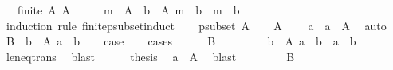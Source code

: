 \begin{isabellebody}
\ \ {\isachardoublequoteopen}{\isasymlbrakk}\ finite\ A{\isacharsemicolon}{\kern0pt}\ A\ {\isasymnoteq}\ {\isacharbraceleft}{\kern0pt}{\isacharbraceright}{\kern0pt}\ {\isasymrbrakk}\ {\isasymLongrightarrow}\ {\isasymexists}\ m\ {\isasymin}\ A{\isachardot}{\kern0pt}\ {\isasymforall}\ b\ {\isasymin}\ A{\isachardot}{\kern0pt}\ m\ {\isasymle}\ b\ {\isasymlongrightarrow}\ m\ {\isacharequal}{\kern0pt}\ b{\isachardoublequoteclose}\isanewline
%
\isadelimproof
%
\endisadelimproof
%
\isatagproof
{}\isamarkupfalse%
\ {\isacharparenleft}{\kern0pt}induction\ rule{\isacharcolon}{\kern0pt}\ finite{\isacharunderscore}{\kern0pt}psubset{\isacharunderscore}{\kern0pt}induct{\isacharparenright}{\kern0pt}\isanewline
\ \ \isamarkupfalse%
\ {\isacharparenleft}{\kern0pt}psubset\ A{\isacharparenright}{\kern0pt}\isanewline
\ \ \isamarkupfalse%
\ {\isacartoucheopen}A\ {\isasymnoteq}\ {\isacharbraceleft}{\kern0pt}{\isacharbraceright}{\kern0pt}{\isacartoucheclose}\ \isamarkupfalse%
\ a\ \ {\isachardoublequoteopen}a\ {\isasymin}\ A{\isachardoublequoteclose}\ \isamarkupfalse%
\ auto\isanewline
\ \ \isamarkupfalse%
\ {\isacharquery}{\kern0pt}B\ {\isacharequal}{\kern0pt}\ {\isachardoublequoteopen}{\isacharbraceleft}{\kern0pt}b\ {\isasymin}\ A{\isachardot}{\kern0pt}\ a\ {\isacharless}{\kern0pt}\ b{\isacharbraceright}{\kern0pt}{\isachardoublequoteclose}\isanewline
\ \ \isamarkupfalse%
\ {\isacharquery}{\kern0pt}case\isanewline
\ \ \isamarkupfalse%
\ cases\isanewline
\ \ \ \ \isamarkupfalse%
\ {\isachardoublequoteopen}{\isacharquery}{\kern0pt}B\ {\isacharequal}{\kern0pt}\ {\isacharbraceleft}{\kern0pt}{\isacharbraceright}{\kern0pt}{\isachardoublequoteclose}\isanewline
\ \ \ \ \isamarkupfalse%
\ {\isachardoublequoteopen}{\isasymforall}\ b\ {\isasymin}\ A{\isachardot}{\kern0pt}\ a\ {\isasymle}\ b\ {\isasymlongrightarrow}\ a\ {\isacharequal}{\kern0pt}\ b{\isachardoublequoteclose}\ \isamarkupfalse%
\ le{\isacharunderscore}{\kern0pt}neq{\isacharunderscore}{\kern0pt}trans\ \isamarkupfalse%
\ blast\isanewline
\ \ \ \ \isamarkupfalse%
\ {\isacharquery}{\kern0pt}thesis\ \isamarkupfalse%
\ {\isacartoucheopen}a\ {\isasymin}\ A{\isacartoucheclose}\ \isamarkupfalse%
\ blast\isanewline
\ \ \isamarkupfalse%
\isanewline
\ \ \ \ \isamarkupfalse%
\ {\isachardoublequoteopen}{\isacharquery}{\kern0pt}B\ {\isasymnoteq}\ {\isacharbraceleft}{\kern0pt}{\isacharbraceright}{\kern0pt}{\isachardoublequoteclose}\isanewline

\end{isabellebody}
